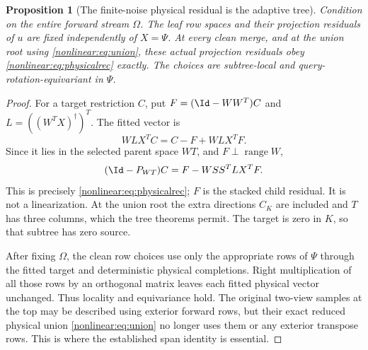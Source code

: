 \documentclass[11pt,oneside,openany,a4paper]{book}
\numberwithin{equation}{chapter}
\newtheorem{proposition}[theorem]{Proposition}
\theoremstyle{definition}
\theoremstyle{remark}
\DeclareMathOperator{\ran}{range}\DeclareMathOperator{\OPT}{OPT}
\begin{document}
\begin{proposition}[The finite-noise physical residual is the adaptive tree]\label{nonlinear:prop:actual}
Condition on the entire forward stream $\Omega$. The leaf row spaces and their projection residuals of $u$ are fixed independently of $X=\Psi$. At every clean merge, and at the union root using \eqref{nonlinear:eq:union}, these actual projection residuals obey \eqref{nonlinear:eq:physicalrec} exactly. The choices are subtree-local and query-rotation-equivariant in $\Psi$.
\end{proposition}
\begin{proof}
For a target restriction $C$, put $F=(\Id-WW^T)C$ and $L=((W^TX)^\dagger)^T$. The fitted vector is
\[
 WLX^TC=C-F+WLX^TF.
\]
Since it lies in the selected parent space $WT$, and $F\perp\ran W$,
\[
 (\Id-P_{WT})C=F-WSS^TLX^TF.
\]
This is precisely \eqref{nonlinear:eq:physicalrec}; $F$ is the stacked child residual. It is not a linearization. At the union root the extra directions $C_K$ are included and $T$ has three columns, which the tree theorems permit. The target is zero in $K$, so that subtree has zero source.

After fixing $\Omega$, the clean row choices use only the appropriate rows of $\Psi$ through the fitted target and deterministic physical completions. Right multiplication of all those rows by an orthogonal matrix leaves each fitted physical vector unchanged. Thus locality and equivariance hold. The original two-view samples at the top may be described using exterior forward rows, but their exact reduced physical union \eqref{nonlinear:eq:union} no longer uses them or any exterior transpose rows. This is where the established span identity is essential.
\end{proof}
\end{document}
